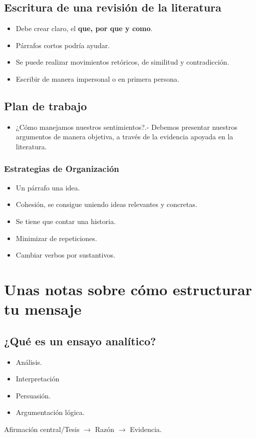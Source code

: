 \section{Escritura de una revisión de la literatura}

\begin{itemize}
    \item Debe crear claro, el \textbf{que, por que y como}. 
    \item Párrafos cortos podría ayudar. 
    \item Se puede realizar movimientos retóricos, de similitud y contradicción.
    \item Escribir de manera impersonal o en primera persona.
\end{itemize}


\section{Plan de trabajo}
\begin{itemize}
    \item ¿Cómo manejamos nuestros sentimientos?.- Debemos presentar nuestros argumentos de manera objetiva, a través de la evidencia apoyada en la literatura.
\end{itemize}

\subsection{Estrategias de Organización}
\begin{itemize}
    \item Un párrafo una idea.
    \item Cohesión, se consigue uniendo ideas relevantes y concretas.
    \item Se tiene que contar una historia.
    \item Minimizar de repeticiones.
    \item Cambiar verbos por sustantivos.
\end{itemize}



\chapter{Unas notas sobre cómo estructurar tu mensaje}

\section{¿Qué es un ensayo analítico?}
\begin{itemize}
    \item Análisis.
    \item Interpretación
    \item Persuasión.
    \item Argumentación lógica.
\end{itemize}
\begin{center}
    Afirmación central/Tesis $\rightarrow$ Razón $\rightarrow$ Evidencia.
\end{center}


